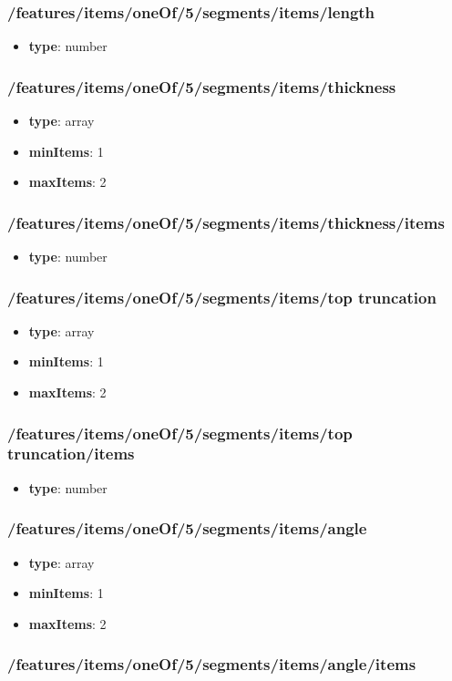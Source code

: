 \subsubsection{/features/items/oneOf/5/segments/items/length}
\begin{itemize}\item {\bf type}: number
\end{itemize}\subsubsection{/features/items/oneOf/5/segments/items/thickness}
\begin{itemize}\item {\bf type}: array
\item {\bf minItems}: 1
\item {\bf maxItems}: 2
\end{itemize}\subsubsection{/features/items/oneOf/5/segments/items/thickness/items}
\begin{itemize}\item {\bf type}: number
\end{itemize}\subsubsection{/features/items/oneOf/5/segments/items/top truncation}
\begin{itemize}\item {\bf type}: array
\item {\bf minItems}: 1
\item {\bf maxItems}: 2
\end{itemize}\subsubsection{/features/items/oneOf/5/segments/items/top truncation/items}
\begin{itemize}\item {\bf type}: number
\end{itemize}\subsubsection{/features/items/oneOf/5/segments/items/angle}
\begin{itemize}\item {\bf type}: array
\item {\bf minItems}: 1
\item {\bf maxItems}: 2
\end{itemize}\subsubsection{/features/items/oneOf/5/segments/items/angle/items}
